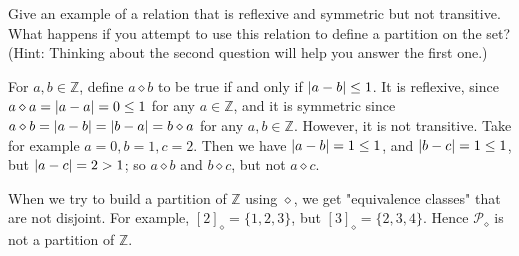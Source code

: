 \begin{problem}[1.5]
	Give an example of a relation that is reflexive and symmetric but not
	transitive. What happens if you attempt to use this relation to define a
	partition on the set? (Hint: Thinking about the second question will help you
	answer the first one.)
\end{problem}

\begin{solution}
	For $a,b\in \mathbb{Z}$, define $a\diamond b$ to be true if and only if
	$\left|a-b\right| \leq 1$. It is reflexive, since $a\diamond a = \left|a-a\right| = 0 \leq 1$
	for any $a\in \mathbb{Z}$, and it is symmetric since $a\diamond b = \left|a-b\right| =
	\left|b-a\right| = b\diamond a$ for any $a,b\in \mathbb{Z}$. However, it is not
	transitive. Take for example $a=0, b=1, c=2$.  Then we have $\left|a-b\right| = 1\leq
	1$, and $\left|b-c\right| = 1\leq 1$, but $\left|a-c\right| = 2 > 1$; so $a\diamond b$ and
	$b\diamond c$, but not $a\diamond c$.
	
	When we try to build a partition of $\mathbb{Z}$ using $\diamond$, we get
	"equivalence classes" that are not disjoint. For example, $[2]_{\diamond} =
	\{1,2,3\}$, but $[3]_{\diamond} = \{2,3,4\}$. Hence $\mathscr{P}_{\diamond}$ is
	not a partition of $\mathbb{Z}$.
\end{solution}

